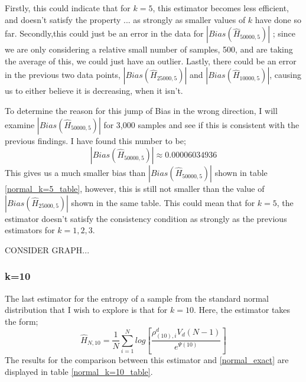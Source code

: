 \documentclass{article}
\begin{document}
Firstly, this could indicate that for $k=5$, this estimator becomes less efficient, and doesn't satisfy the property ...  as strongly as smaller values of $k$ have done so far. Secondly,this could just be an error in the data for $|Bias(\hat{H}_{50000, 5})|$ ; since we are only considering a relative small number of samples, 500, and are taking the average of this, we could just have an outlier. Lastly, there could be an error in the previous two data points, $|Bias(\hat{H}_{25000, 5})|$ and $|Bias(\hat{H}_{10000, 5})|$, causing us to either believe it is decreasing, when it isn't.

To determine the reason for this jump of Bias in the wrong direction, I will examine $|Bias(\hat{H}_{50000, 5})|$ for 3,000 samples and see if this is consistent with the previous findings. I have found this number to be; 
\begin{equation} 
|Bias(\hat{H}_{50000, 5})|  \approx 0.00006034936 \nonumber
\end{equation}
This gives us a much smaller bias than $|Bias(\hat{H}_{50000, 5})|$ shown in table \ref{normal_k=5_table}, however, this is still not smaller than the value of $|Bias(\hat{H}_{25000, 5})|$ shown in the same table. This could mean that for $k=5$, the estimator doesn't satisfy the consistency condition as strongly as the previous estimators for $k=1, 2, 3$.

CONSIDER GRAPH...


\subsubsection{k=10} \label{N_k=10}
The last estimator for the entropy of a sample from the standard normal distribution that I wish to explore is that for $k=10$. Here, the estimator takes the form;
\begin{equation}
\hat{H}_{N, 10} = \frac{1}{N} \sum_{i=1}^{N} log \left[ \frac{\rho_{(10),i}^{d} V_{d} (N-1)}{e^{\Psi(10)}} \right] \nonumber
\end{equation}
The results for the comparison between this estimator and \ref{normal_exact} are displayed in table \ref{normal_k=10_table}.
\end{document}
